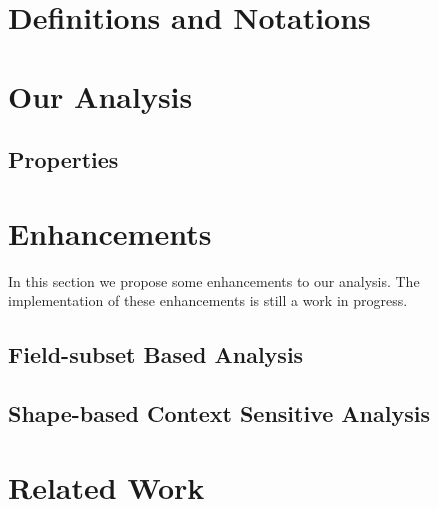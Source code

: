 \documentclass[twocolumn]{svjour3}          %
\begin{document}
\section{Definitions and Notations}
\label{sec:Formal_Definitions}


\section{Our Analysis} \label{sec:Analysis}


	\subsection{Properties}\label{subsec:props}
	


        
\section{Enhancements} \label{sec:Enhancements}
In  this   section  we  propose  some   enhancements  to  our
analysis. The implementation of these enhancements is still a
work in progress.

	\subsection{Field-subset Based
          Analysis}\label{subsec:Subset_Based_Analysis} 
	

	\subsection{Shape-based Context Sensitive
          Analysis}\label{subsec:Shape_Sensitive_Approach} 
	
        
        
\section{Related Work}\label{sec:bgrel}

\end{document}
